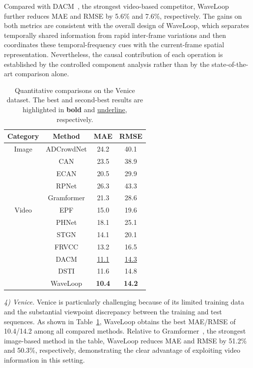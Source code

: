 \documentclass[lettersize,journal]{IEEEtran}
\begin{document}
Compared with DACM~\cite{ling2025dual}, the strongest video-based competitor, WaveLoop further reduces MAE and RMSE by 5.6\% and 7.6\%, respectively. The gains on both metrics are consistent with the overall design of WaveLoop, which separates temporally shared information from rapid inter-frame variations and then coordinates these temporal-frequency cues with the current-frame spatial representation. Nevertheless, the causal contribution of each operation is established by the controlled component analysis rather than by the state-of-the-art comparison alone.

\begin{table}[h]
\caption{Quantitative comparisons on the Venice dataset. The best and second-best results are highlighted in \textbf{bold} and \underline{underline}, respectively.}
\centering
\scriptsize
\begin{tabular}{@{}cccc@{}}
\toprule
Category & Method & MAE & RMSE  \\ 
\midrule
Image & ADCrowdNet \cite{liu2019adcrowdnet} & 24.2 & 40.1 \\
& CAN \cite{liu2019context} & 23.5 & 38.9 \\
& ECAN \cite{liu2019context} & 20.5 & 29.9 \\
& RPNet \cite{yang2020reverse} & 26.3 & 43.3 \\
& Gramformer \cite{lin2024gramformer} & 21.3 & 28.6 \\
\midrule
Video & EPF \cite{liu2020estimating} & 15.0 & 19.6 \\
& PHNet \cite{meng2021phnet} & 18.1 & 25.1 \\
& STGN \cite{wu2022spatial} & 14.1 & 20.1 \\
& FRVCC \cite{hou2023frame}  & {13.2} & {16.5} \\
& DACM \cite{ling2025dual} & \underline{11.1} & \underline{14.3} \\
& DSTI \cite{ling2026dual} & 11.6 & 14.8 \\
& WaveLoop  & \textbf{10.4} & \textbf{14.2} \\
\bottomrule
\end{tabular}
\label{tab:4}
\vspace{-1em}
\end{table}

\textit{4) Venice.}
Venice is particularly challenging because of its limited training data and the substantial viewpoint discrepancy between the training and test sequences. As shown in Table~\ref{tab:4}, WaveLoop obtains the best MAE/RMSE of 10.4/14.2 among all compared methods. Relative to Gramformer~\cite{lin2024gramformer}, the strongest image-based method in the table, WaveLoop reduces MAE and RMSE by 51.2\% and 50.3\%, respectively, demonstrating the clear advantage of exploiting video information in this setting.
\end{document}
